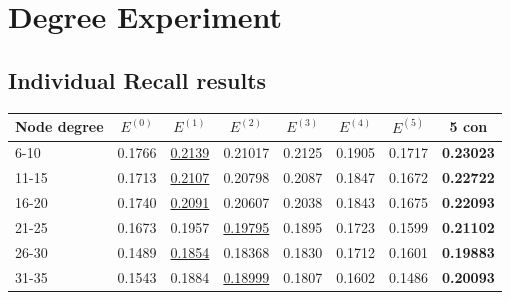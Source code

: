 \section{Degree Experiment}\label{app:degree-experiment}

\subsection{Individual Recall results}

\begin{table}[]
    \centering
    \begin{tabular}{|l|l|l|l|l|l|l||l|}
        \hline
        Node degree & \multicolumn{1}{c|}{$E^{(0)}$} & \multicolumn{1}{c|}{$E^{(1)}$} & \multicolumn{1}{c|}{$E^{(2)}$} & \multicolumn{1}{c|}{$E^{(3)}$} & \multicolumn{1}{c|}{$E^{(4)}$} & \multicolumn{1}{c||}{$E^{(5)}$} & \multicolumn{1}{c|}{5 con} \\ \hline
        6-10        & 0.1766                         & \underline{0.2139}             & 0.21017                        & 0.2125                         & 0.1905                         & 0.1717                          & \textbf{0.23023}           \\ \hline
        11-15       & 0.1713                         & \underline{0.2107}             & 0.20798                        & 0.2087                         & 0.1847                         & 0.1672                          & \textbf{0.22722}           \\ \hline
        16-20       & 0.1740                         & \underline{0.2091}             & 0.20607                        & 0.2038                         & 0.1843                         & 0.1675                          & \textbf{0.22093}           \\ \hline
        21-25       & 0.1673                         & 0.1957                         & \underline{0.19795}            & 0.1895                         & 0.1723                         & 0.1599                          & \textbf{0.21102}           \\ \hline
        26-30       & 0.1489                         & \underline{0.1854}             & 0.18368                        & 0.1830                         & 0.1712                         & 0.1601                          & \textbf{0.19883}           \\ \hline
        31-35       & 0.1543                         & 0.1884                         & \underline{0.18999}            & 0.1807                         & 0.1602                         & 0.1486                          & \textbf{0.20093}           \\ \hline

\end{tabular}
\end{table}
